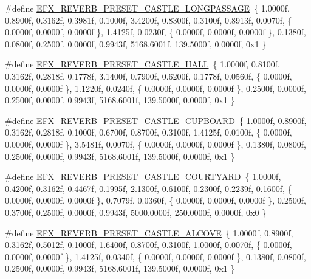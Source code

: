 \begin{DoxyCompactItemize}
\item 
\#define \mbox{\hyperlink{efx-presets_8h_a1861da1622216f2adc3d5183456760c9}{E\+F\+X\+\_\+\+R\+E\+V\+E\+R\+B\+\_\+\+P\+R\+E\+S\+E\+T\+\_\+\+C\+A\+S\+T\+L\+E\+\_\+\+L\+O\+N\+G\+P\+A\+S\+S\+A\+GE}}~\{ 1.\+0000f, 0.\+8900f, 0.\+3162f, 0.\+3981f, 0.\+1000f, 3.\+4200f, 0.\+8300f, 0.\+3100f, 0.\+8913f, 0.\+0070f, \{ 0.\+0000f, 0.\+0000f, 0.\+0000f \}, 1.\+4125f, 0.\+0230f, \{ 0.\+0000f, 0.\+0000f, 0.\+0000f \}, 0.\+1380f, 0.\+0800f, 0.\+2500f, 0.\+0000f, 0.\+9943f, 5168.\+6001f, 139.\+5000f, 0.\+0000f, 0x1 \}
\item 
\#define \mbox{\hyperlink{efx-presets_8h_a849c407784f05de02d3c3fdff68e573a}{E\+F\+X\+\_\+\+R\+E\+V\+E\+R\+B\+\_\+\+P\+R\+E\+S\+E\+T\+\_\+\+C\+A\+S\+T\+L\+E\+\_\+\+H\+A\+LL}}~\{ 1.\+0000f, 0.\+8100f, 0.\+3162f, 0.\+2818f, 0.\+1778f, 3.\+1400f, 0.\+7900f, 0.\+6200f, 0.\+1778f, 0.\+0560f, \{ 0.\+0000f, 0.\+0000f, 0.\+0000f \}, 1.\+1220f, 0.\+0240f, \{ 0.\+0000f, 0.\+0000f, 0.\+0000f \}, 0.\+2500f, 0.\+0000f, 0.\+2500f, 0.\+0000f, 0.\+9943f, 5168.\+6001f, 139.\+5000f, 0.\+0000f, 0x1 \}
\item 
\#define \mbox{\hyperlink{efx-presets_8h_aea087279f39010f8ba13a8ae746c741d}{E\+F\+X\+\_\+\+R\+E\+V\+E\+R\+B\+\_\+\+P\+R\+E\+S\+E\+T\+\_\+\+C\+A\+S\+T\+L\+E\+\_\+\+C\+U\+P\+B\+O\+A\+RD}}~\{ 1.\+0000f, 0.\+8900f, 0.\+3162f, 0.\+2818f, 0.\+1000f, 0.\+6700f, 0.\+8700f, 0.\+3100f, 1.\+4125f, 0.\+0100f, \{ 0.\+0000f, 0.\+0000f, 0.\+0000f \}, 3.\+5481f, 0.\+0070f, \{ 0.\+0000f, 0.\+0000f, 0.\+0000f \}, 0.\+1380f, 0.\+0800f, 0.\+2500f, 0.\+0000f, 0.\+9943f, 5168.\+6001f, 139.\+5000f, 0.\+0000f, 0x1 \}
\item 
\#define \mbox{\hyperlink{efx-presets_8h_a657914b06a7a4bcefcfc00635fce1673}{E\+F\+X\+\_\+\+R\+E\+V\+E\+R\+B\+\_\+\+P\+R\+E\+S\+E\+T\+\_\+\+C\+A\+S\+T\+L\+E\+\_\+\+C\+O\+U\+R\+T\+Y\+A\+RD}}~\{ 1.\+0000f, 0.\+4200f, 0.\+3162f, 0.\+4467f, 0.\+1995f, 2.\+1300f, 0.\+6100f, 0.\+2300f, 0.\+2239f, 0.\+1600f, \{ 0.\+0000f, 0.\+0000f, 0.\+0000f \}, 0.\+7079f, 0.\+0360f, \{ 0.\+0000f, 0.\+0000f, 0.\+0000f \}, 0.\+2500f, 0.\+3700f, 0.\+2500f, 0.\+0000f, 0.\+9943f, 5000.\+0000f, 250.\+0000f, 0.\+0000f, 0x0 \}
\item 
\#define \mbox{\hyperlink{efx-presets_8h_adde71ddbf4797faa9b58d4b5f7314f56}{E\+F\+X\+\_\+\+R\+E\+V\+E\+R\+B\+\_\+\+P\+R\+E\+S\+E\+T\+\_\+\+C\+A\+S\+T\+L\+E\+\_\+\+A\+L\+C\+O\+VE}}~\{ 1.\+0000f, 0.\+8900f, 0.\+3162f, 0.\+5012f, 0.\+1000f, 1.\+6400f, 0.\+8700f, 0.\+3100f, 1.\+0000f, 0.\+0070f, \{ 0.\+0000f, 0.\+0000f, 0.\+0000f \}, 1.\+4125f, 0.\+0340f, \{ 0.\+0000f, 0.\+0000f, 0.\+0000f \}, 0.\+1380f, 0.\+0800f, 0.\+2500f, 0.\+0000f, 0.\+9943f, 5168.\+6001f, 139.\+5000f, 0.\+0000f, 0x1 \}

\end{DoxyCompactItemize}
